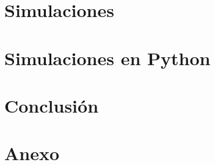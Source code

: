 \documentclass[11pt]{article}
\begin{document}
\section{Simulaciones}


\section{Simulaciones en Python}


\section{Conclusión}


\section{Anexo}


\printbibliography

%
\end{document}
